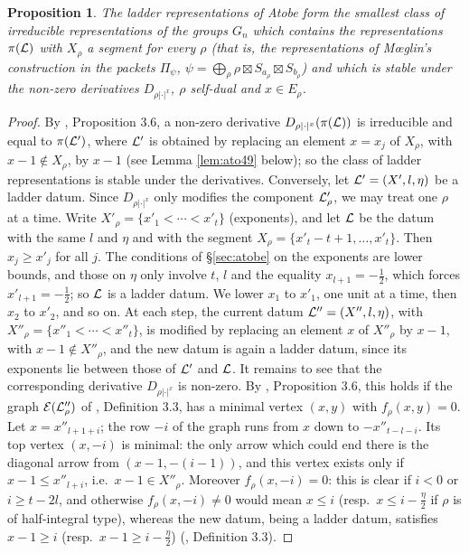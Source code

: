 \documentclass[a4paper,12pt,leqno]{amsart}
\theoremstyle{plain}
\newtheorem{prop}[thm]{Proposition}
\theoremstyle{definition}
\begin{document}
\begin{prop}\label{prop:arthurclosure} The ladder representations of Atobe form the smallest class of
irreducible representations of the groups $G_n$ which contains the representations $\pi(\mathcal{L})$ with
$X_\rho$ a segment for every $\rho$ (that is, the representations of M\oe glin's construction in the
packets $\Pi_\psi$, $\psi=\bigoplus_\rho\rho\boxtimes S_{a_\rho}\boxtimes S_{b_\rho}$) and which is stable
under the non-zero derivatives $D_{\rho|\cdot|^x}$, $\rho$ self-dual and $x\in E_\rho$.
\end{prop}

\begin{proof}
By \cite{Ato24}, Proposition 3.6, a non-zero derivative $D_{\rho|\cdot|^x}(\pi(\mathcal{L}))$ is irreducible and
equal to $\pi(\mathcal{L}')$, where $\mathcal{L}'$ is obtained by replacing an element $x=x_j$ of $X_\rho$, with
$x-1\notin X_\rho$, by $x-1$ (see Lemma \ref{lem:ato49} below); so the class of ladder representations
is stable under the derivatives. Conversely, let $\mathcal{L}'=(X',l,\eta)$ be a ladder datum. Since
$D_{\rho|\cdot|^x}$ only modifies the component $\mathcal{L}'_\rho$, we may treat one $\rho$ at a time. Write
$X'_\rho=\{x'_1<\cdots<x'_t\}$ (exponents), and let $\mathcal{L}$ be the datum with the same $l$ and $\eta$ and
with the segment $X_\rho=\{x'_t-t+1,\ldots,x'_t\}$. Then $x_j\geq x'_j$ for all $j$. The conditions of
\S\ref{sec:atobe} on the exponents are lower bounds, and those on $\eta$ only involve $t$, $l$ and the
equality $x_{l+1}=-\frac12$, which forces $x'_{l+1}=-\frac12$; so $\mathcal{L}$ is a ladder datum. We lower
$x_1$ to $x'_1$, one unit at a time, then $x_2$ to $x'_2$, and so on. At each step, the current datum $\mathcal{L}''=(X'',l,\eta)$, with
$X''_\rho=\{x''_1<\cdots<x''_t\}$, is modified by replacing an element $x$ of $X''_\rho$ by $x-1$, with
$x-1\notin X''_\rho$, and the new datum is again a ladder datum, since its exponents lie between those of $\mathcal{L}'$ and $\mathcal{L}$. It remains to see that the
corresponding derivative $D_{\rho|\cdot|^x}$ is non-zero. By \cite{Ato24}, Proposition 3.6, this holds
if the graph $\mathcal E(\mathcal{L}''_\rho)$ of \cite{Ato24}, Definition 3.3, has a minimal vertex $(x,y)$
with $f_\rho(x,y)=0$. Let $x=x''_{l+1+i}$; the row $-i$ of the graph runs from $x$ down to
$-x''_{t-l-i}$. Its top vertex $(x,-i)$ is minimal: the only arrow which could end there is the
diagonal arrow from $(x-1,-(i-1))$, and this vertex exists only if $x-1\leq x''_{l+i}$, i.e.\ $x-1\in
X''_\rho$. Moreover $f_\rho(x,-i)=0$: this is clear if $i<0$ or $i\geq t-2l$, and otherwise
$f_\rho(x,-i)\neq0$ would mean $x\leq i$ (resp.\ $x\leq i-\frac\eta2$ if $\rho$ is of half-integral
type), whereas the new datum, being a ladder datum, satisfies $x-1\geq i$ (resp.\ $x-1\geq
i-\frac\eta2$) (\cite{Ato24}, Definition 3.3).
\end{proof}
\end{document}
